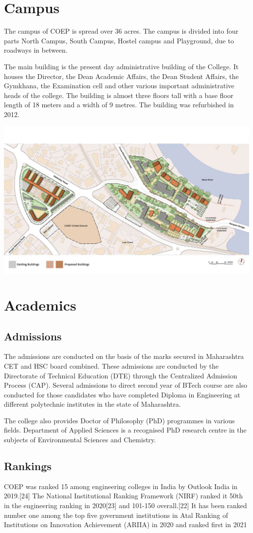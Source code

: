 \documentclass{article}
\begin{document}
\section{Campus}
The campus of COEP is spread over 36 acres. The campus is divided into four parts North Campus, South Campus, Hostel campus and Playground, due to roadways in between.

The main building is the present day administrative building of the College. It houses the Director, the Dean Academic Affairs, the Dean Student Affairs, the Gymkhana, the Examination cell and other various important administrative heads of the college. The building is almost three floors tall with a base floor length of 18 meters and a width of 9 metres. The building was refurbished in 2012.
\begin{center}
  \includegraphics[width=0.7\linewidth]{coep3.jpg}
  \label{fig:2} 
\end{center}
\section{Academics}
\subsection{Admissions}
The admissions are conducted on the basis of the marks secured in Maharashtra CET and HSC board combined. These admissions are conducted by the Directorate of Technical Education (DTE) through the Centralized Admission Process (CAP). Several admissions to direct second year of BTech course are also conducted for those candidates who have completed Diploma in Engineering at different polytechnic institutes in the state of Maharashtra. 

The college also provides Doctor of Philosophy (PhD) programmes in various fields. Department of Applied Sciences is a recognised PhD research centre in the subjects of Environmental Sciences and Chemistry.
\subsection{Rankings}
COEP was ranked 15 among engineering colleges in India by Outlook India in 2019.[24] The National Institutional Ranking Framework (NIRF) ranked it 50th in the engineering ranking in 2020[23] and 101-150 overall.[22] It has been ranked number one among the top five government institutions in Atal Ranking of Institutions on Innovation Achievement (ARIIA) in 2020 and ranked first in 2021
\end{document}
